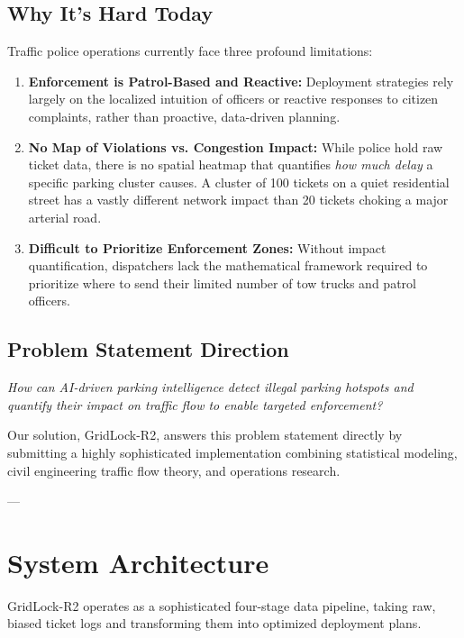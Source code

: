 \documentclass[12pt,a4paper]{article}
\begin{document}
\subsection{Why It’s Hard Today}
Traffic police operations currently face three profound limitations:
\begin{enumerate}[leftmargin=*]
    \item \textbf{Enforcement is Patrol-Based and Reactive:} Deployment strategies rely largely on the localized intuition of officers or reactive responses to citizen complaints, rather than proactive, data-driven planning.
    \item \textbf{No Map of Violations vs. Congestion Impact:} While police hold raw ticket data, there is no spatial heatmap that quantifies \textit{how much delay} a specific parking cluster causes. A cluster of 100 tickets on a quiet residential street has a vastly different network impact than 20 tickets choking a major arterial road.
    \item \textbf{Difficult to Prioritize Enforcement Zones:} Without impact quantification, dispatchers lack the mathematical framework required to prioritize where to send their limited number of tow trucks and patrol officers.
\end{enumerate}

\subsection{Problem Statement Direction}
\begin{tcolorbox}[colback=blue!5!white,colframe=blue!75!black,title=Core Problem Statement]
\textit{How can AI-driven parking intelligence detect illegal parking hotspots and quantify their impact on traffic flow to enable targeted enforcement?}
\end{tcolorbox}

Our solution, GridLock-R2, answers this problem statement directly by submitting a highly sophisticated implementation combining statistical modeling, civil engineering traffic flow theory, and operations research. 

---

\section{System Architecture}

GridLock-R2 operates as a sophisticated four-stage data pipeline, taking raw, biased ticket logs and transforming them into optimized deployment plans. 
\end{document}
